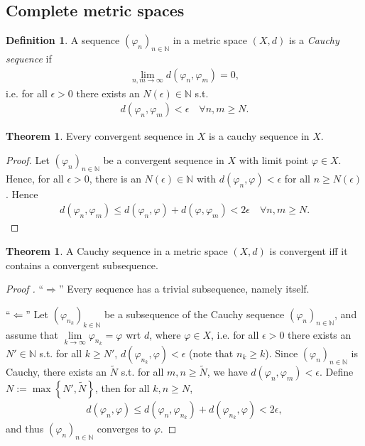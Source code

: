 \documentclass[12pt, a4paper]{article}
\numberwithin{equation}{section}
\theoremstyle{definition}
\theoremstyle{definition}
\newtheorem{defn}[thm]{Definition} %
\newtheorem{theorem}[thm]{Theorem}
\newcommand{\seq}[1][\varphi]{\left( #1 \right)_{n \in \mathbb{N}}}
\begin{document}
	\subsection{Complete metric spaces}
	
	\begin{defn}
		A sequence $(\varphi_n)_{n\in\mathbb N}$ in a metric space $(X, d)$ is a \textit{Cauchy sequence} if 
		\begin{align}
			\lim\limits_{n, m\to\infty} d(\varphi_n, \varphi_m) = 0,
		\end{align}
		i.e. for all $\epsilon > 0$ there exists an $N(\epsilon)\in \mathbb N$ s.t. 
		\begin{align}
			d(\varphi_n, \varphi_m) < \epsilon \quad\forall n, m\geq N.
		\end{align}
	\end{defn}

	\begin{theorem}\label{thrm:convergent_sequence_cauchy_sequence}
		Every convergent sequence in $X$ is a cauchy sequence in $X$.
	\end{theorem}

	\begin{proof}
		Let $(\varphi_n)_{n\in\mathbb N}$ be a convergent sequence in $X$ with limit point $\varphi\in X$. Hence, for all $\epsilon > 0$, there is an $N(\epsilon)\in\mathbb N$ with $d(\varphi_n, \varphi) < \epsilon$ for all $n\geq N(\epsilon)$. Hence
		\begin{align}
			d(\varphi_n, \varphi_m) \leq d(\varphi_n, \varphi) + d(\varphi, \varphi_m) < 2\epsilon \quad\forall n,m\geq N.
		\end{align}
	\end{proof}

	\begin{theorem}\label{thrm:cauchy_convergent_subsequence}
		A Cauchy sequence in a metric space $(X, d)$ is convergent iff it contains a convergent subsequence.
	\end{theorem}

	\begin{proof}[Proof \cite{354965}]
		\enquote{$\Longrightarrow$} Every sequence has a trivial subsequence, namely itself.
		
		\enquote{$\Longleftarrow$} Let $\left(\varphi_{n_k}\right)_{k\in\mathbb N}$ be a subsequence of the Cauchy sequence $\seq[\varphi_n]$, and assume that $\lim\limits_{k\to\infty}\varphi_{n_k} = \varphi$ wrt $d$, where $\varphi\in X$, i.e. for all $\epsilon > 0$ there exists an $N'\in\mathbb N$ s.t. for all $k\geq N'$, $d(\varphi_{n_k}, \varphi) < \epsilon$ (note that $n_k \geq k$). Since $\seq[\varphi_n]$ is Cauchy, there exists an $\tilde{N}$ s.t. for all $m, n\geq \tilde{N}$, we have $d(\varphi_n, \varphi_m) < \epsilon$. Define $N := \max\left\{N', \tilde{N}\right\}$, then for all $k, n\geq N$,
		\begin{align*}
			d(\varphi_n, \varphi) \leq d(\varphi_n, \varphi_{n_k}) + d(\varphi_{n_k}, \varphi) < 2\epsilon,
		\end{align*}
		and thus $\seq[\varphi_n]$ converges to $\varphi$.
	\end{proof}
\end{document}
